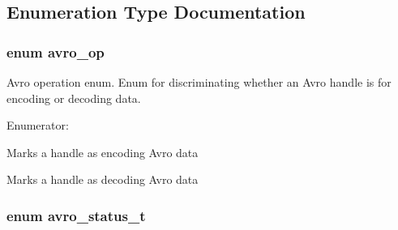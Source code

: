\subsection{Enumeration Type Documentation}
\hypertarget{group___handle___routines_gcd8ee9ad4a4882eef8e3d9a0d5faec68}{
\subsubsection[{avro\_\-op}]{\setlength{\rightskip}{0pt plus 5cm}enum {\bf avro\_\-op}}}
\label{group___handle___routines_gcd8ee9ad4a4882eef8e3d9a0d5faec68}


Avro operation enum. Enum for discriminating whether an Avro handle is for encoding or decoding data. \begin{Desc}
\item[Enumerator: ]\par
\begin{description}
\item[{\em 
\hypertarget{group___handle___routines_ggcd8ee9ad4a4882eef8e3d9a0d5faec68037c26ec9dd8b98243aa9aed3f80160b}{
AVRO\_\-ENCODE}
\label{group___handle___routines_ggcd8ee9ad4a4882eef8e3d9a0d5faec68037c26ec9dd8b98243aa9aed3f80160b}
}]Marks a handle as encoding Avro data \item[{\em 
\hypertarget{group___handle___routines_ggcd8ee9ad4a4882eef8e3d9a0d5faec682802292d4fd32b8eb68872bcc03bd1dd}{
AVRO\_\-DECODE}
\label{group___handle___routines_ggcd8ee9ad4a4882eef8e3d9a0d5faec682802292d4fd32b8eb68872bcc03bd1dd}
}]Marks a handle as decoding Avro data \end{description}
\end{Desc}

\hypertarget{group___handle___routines_g4271ca78aabaaad628d7b632aa5a1499}{
\subsubsection[{avro\_\-status\_\-t}]{\setlength{\rightskip}{0pt plus 5cm}enum {\bf avro\_\-status\_\-t}}}
\label{group___handle___routines_g4271ca78aabaaad628d7b632aa5a1499}



